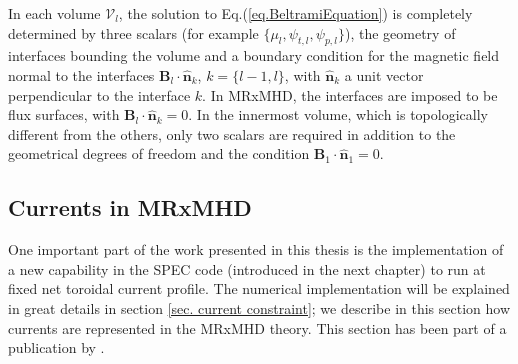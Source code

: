 \documentclass[my_thesis.tex]{subfiles}
\begin{document}
In each volume $\mathcal{V}_l$, the solution to Eq.(\ref{eq.BeltramiEquation}) is completely determined by three scalars (for example $\{\mu_l,\psi_{t,l},\psi_{p,l}\}$), the geometry of interfaces bounding the volume and a boundary condition for the magnetic field normal to the interfaces $\mathbf{B}_l\cdot\hat{\mathbf{n}}_k$, $k=\{l-1,l\}$, with $\hat{\mathbf{n}}_k$ a unit vector perpendicular to the interface $k$. In \ac{MRxMHD}, the interfaces are imposed to be flux surfaces, with $\mathbf{B}_l\cdot\hat{\mathbf{n}}_k=0$. In the innermost volume, which is topologically different from the others, only two scalars are required in addition to the geometrical degrees of freedom and the condition $\mathbf{B}_1\cdot\hat{\mathbf{n}}_1=0$.



\subsection{Currents in MRxMHD}
One important part of the work presented in this thesis is the implementation of a new capability in the SPEC code (introduced in the next chapter) to run at fixed net toroidal current profile. The numerical implementation will be explained in great details in section \ref{sec. current constraint}; we describe in this section how currents are represented in the MRxMHD theory. This section has been part of a publication by \citet{Baillod2021}.
\end{document}
